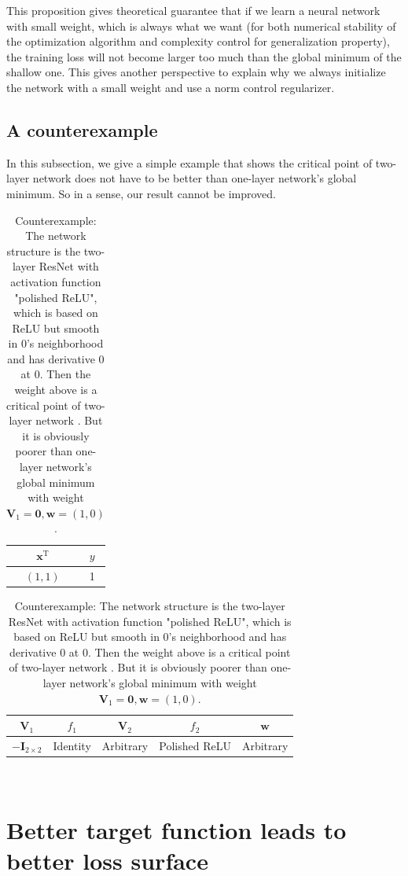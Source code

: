 \documentclass{article}
\theoremstyle{plain}
\theoremstyle{definition}
\begin{document}
This proposition gives theoretical guarantee that if we learn a neural network with small weight,
which is always what we want (for both numerical stability of the optimization algorithm and complexity control for generalization property),
the training loss will not become larger too much than the global minimum of the shallow one.
This gives another perspective to explain why we always initialize the network with a small weight
and use a norm control regularizer.

\subsection{A counterexample}
In this subsection, we give a simple example that shows the critical point of two-layer network does not have to be better
than one-layer network's global minimum. So in a sense, our result cannot be improved.

\begin{table}[H]
\begin{minipage}[t]{0.3\linewidth}
\centering
\begin{tabular}{|c|c|}
\hline $\mathbf x^\mathrm{T}$&$y$\\
\hline $(1,1)$&1\\
\hline
\end{tabular}
\end{minipage}
\begin{minipage}[t]{0.5\linewidth}
\centering
\begin{tabular}{|c|c|c|c|c|}
\hline $\mathbf V_1$&$f_1$&$\mathbf V_2$&$f_2$&$\mathbf w$\\
\hline $-\mathbf{I}_{2\times 2}$&Identity&Arbitrary&Polished ReLU&Arbitrary\\
\hline
\end{tabular}
\end{minipage}
\\
\caption{Counterexample: The network structure is the two-layer ResNet with activation function "polished ReLU",
which is based on ReLU but smooth in 0's neighborhood and has derivative 0 at 0. Then the weight above is a critical point of two-layer network . But it is obviously poorer than one-layer network's global minimum with weight $\mathbf V_1=\mathbf 0, \mathbf w=(1,0)$.}
\label{counter1}
\end{table}

\section{Better target function leads to better loss surface}
\end{document}
